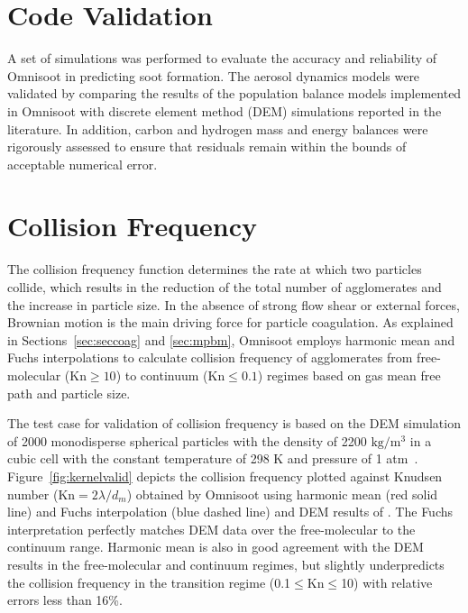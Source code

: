 \section{Code Validation}
A set of simulations was performed to evaluate the accuracy and reliability of Omnisoot in predicting soot formation. The aerosol dynamics models were validated by comparing the results of the population balance models implemented in Omnisoot with discrete element method (DEM) simulations reported in the literature. In addition, carbon and hydrogen mass and energy balances were rigorously assessed to ensure that residuals remain within the bounds of acceptable numerical error.


\section{Collision Frequency}
The collision frequency function determines the rate at which two particles collide, which results in the reduction of the total number of agglomerates and the increase in particle size. In the absence of strong flow shear or external forces, Brownian motion is the main driving force for particle coagulation. As explained in Sections~\ref{sec:seccoag} and \ref{sec:mpbm}, Omnisoot employs harmonic mean and Fuchs interpolations to calculate collision frequency of agglomerates from free-molecular ($\mathrm{Kn}\ge10$) to continuum ($\mathrm{Kn}\le0.1$) regimes based on gas mean free path and particle size. 


The test case for validation of collision frequency is based on the DEM simulation of 2000 monodisperse spherical particles with the density of 2200 $\mathrm{kg/m^3}$ in
a cubic cell with the constant temperature of 298 K and pressure of 1 atm~\citep{goudeli2015coagulation}. Figure~\ref{fig:kernelvalid} depicts the collision frequency plotted against Knudsen number (Kn$=2\lambda/d_m$) obtained by Omnisoot using harmonic mean (red solid line) and Fuchs interpolation (blue dashed line) and DEM results of \citet{goudeli2015coagulation}. The Fuchs interpretation perfectly matches DEM data over the free-molecular to the continuum range. Harmonic mean is also in good agreement with the DEM results in the free-molecular and continuum regimes, but slightly underpredicts the collision frequency in the transition regime (0.1$\le$Kn$\le$10) with relative errors less than 16\%.

